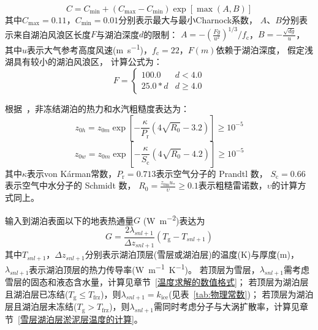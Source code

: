 \begin{equation}
  C=C_{\mathrm{min}}+\left(C_{\mathrm{max}}-C_{\mathrm{min}}\right) \exp\left[\max (A, B)\right]
\end{equation}
其中$C_{\mathrm{max}}=0.11$，$C_{\mathrm{min}}=0.01$分别表示最大与最小Charnock系数，
$A$、$B$分别表示来自湖泊风浪区长度$F$与湖泊深度$d$的限制：
$A=-\left(\frac{Fg}{u^2}\right)^{1/3}/f_{\mathrm {c}} $，$B=-\frac{\sqrt{dg}}{u}$，
其中$u$表示大气参考高度风速(\unit{m.s^{-1}})，$f_{\mathrm {c}} =22$，$F(m)$依赖于湖泊深度，
假定浅湖具有较小的湖泊风浪区，
计算公式为：$$F=\left\{\begin{array}{ll}100.0 & d<4.0 \\ 25.0 * d & d \geqslant 4.0\end{array}\right.$$


根据~\citet{Zilitinkevich2001}，非冻结湖泊的热力和水汽粗糙度表达为：
\begin{equation}
  z_{0 h}=z_{0 m} \exp \left[-\frac{\kappa}{P_{\mathrm{r}}}\left(4 \sqrt{R_{0}}-3.2\right)\right] \geqslant 10^{-5}
\end{equation}
\begin{equation}
  z_{0 w}=z_{0 m} \exp \left[-\frac{\kappa}{S_{\mathrm{c}}}\left(4 \sqrt{R_{0}}-4.2\right)\right] \geqslant 10^{-5}
\end{equation}
其中$\kappa$表示von K\'arman常数，$P_{\mathrm {r}} =0.713$表示空气分子的 Prandtl 数，
$S_{\mathrm {c}} =0.66$表示空气中水分子的 Schmidt 数，
$R_0=\frac{z_{\mathrm{0m}}u_\ast}{\upsilon}\geqslant0.1$表示粗糙雷诺数，$\upsilon$的计算方式同上。


输入到湖泊表面以下的地表热通量$G$ (\unit{W.m^{-2}})表达为
\begin{equation}
  G=\frac{2 \lambda_{snl+1}}{\Delta z_{snl+1}}\left(T_{\mathrm{g}}-T_{snl+1}\right)
\end{equation}
其中$T_{snl+1}$，$\Delta z_{snl+1}$分别表示湖泊顶层(雪层或湖泊层)的温度(K)与厚度(m)，
$\lambda_{snl+1}$表示湖泊顶层的热力传导率(\unit{W.m^{-1}.K^{-1}})。
若顶层为雪层，$\lambda_{snl+1}$需考虑雪层的固态和液态含水量，计算见章节~\ref{温度求解的数值格式}；
若顶层为湖泊层且湖泊层已冻结($T_{\mathrm {g}} \leqslant T_{\mathrm {frz}} $)，则$\lambda_{snl+1}=k_{\mathrm {ice}}$(见表~\ref{tab:物理常数})；
若顶层为湖泊层且湖泊层未冻结($T_{\mathrm {g}} >T_{\mathrm {frz}} $)，则$\lambda_{snl+1}$需同时考虑分子与大涡扩散率，计算见章节~\ref{雪层湖泊层淤泥层温度的计算}。


